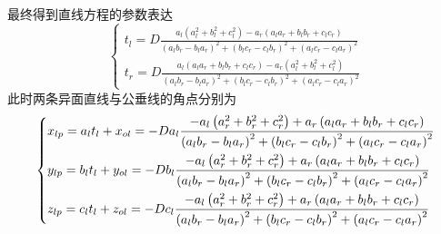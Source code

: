 最终得到直线方程的参数表达
\begin{equation}
\left\{
\begin{aligned}
t_l=D \frac{\displaystyle a_l (a_l^2 + b_l^2 + c_l^2) - a_r (a_la_r + b_lb_r + c_lc_r)}{\displaystyle (a_lb_r-b_la_r)^2 + (b_lc_r-c_lb_r)^2 + (a_lc_r-c_la_r)^2} \\
t_r=D \frac{\displaystyle a_l(a_la_r + b_lb_r + c_lc_r)  - a_r (a_l^2 + b_l^2 + c_l^2)}{\displaystyle (a_lb_r-b_la_r)^2 + (b_lc_r-c_lb_r)^2 + (a_lc_r-c_la_r)^2}
\end{aligned}
\right.
\end{equation}
此时两条异面直线与公垂线的角点分别为
\begin{equation}
\left\{ \begin{gathered}
{x_{lp}} = {a_l}{t_l} + {x_{ol}} =  - D{a_l}\frac{{ - {a_l}\left( {a_r^2 + b_r^2 + c_r^2} \right) + {a_r}\left( {{a_l}{a_r} + {b_l}{b_r} + {c_l}{c_r}} \right)}}{{{{\left( {{a_l}{b_r} - {b_l}{a_r}} \right)}^2} + {{\left( {{b_l}{c_r} - {c_l}{b_r}} \right)}^2} + {{\left( {{a_l}{c_r} - {c_l}{a_r}} \right)}^2}}} \hfill \\
{y_{lp}} = {b_l}{t_l} + {y_{ol}} =  - D{b_l}\frac{{ - {a_l}\left( {a_r^2 + b_r^2 + c_r^2} \right) + {a_r}\left( {{a_l}{a_r} + {b_l}{b_r} + {c_l}{c_r}} \right)}}{{{{\left( {{a_l}{b_r} - {b_l}{a_r}} \right)}^2} + {{\left( {{b_l}{c_r} - {c_l}{b_r}} \right)}^2} + {{\left( {{a_l}{c_r} - {c_l}{a_r}} \right)}^2}}} \hfill \\
{z_{lp}} = {c_l}{t_l} + {z_{ol}} =  - D{c_l}\frac{{ - {a_l}\left( {a_r^2 + b_r^2 + c_r^2} \right) + {a_r}\left( {{a_l}{a_r} + {b_l}{b_r} + {c_l}{c_r}} \right)}}{{{{\left( {{a_l}{b_r} - {b_l}{a_r}} \right)}^2} + {{\left( {{b_l}{c_r} - {c_l}{b_r}} \right)}^2} + {{\left( {{a_l}{c_r} - {c_l}{a_r}} \right)}^2}}} \hfill \\ 
\end{gathered}  \right.
\end{equation}

